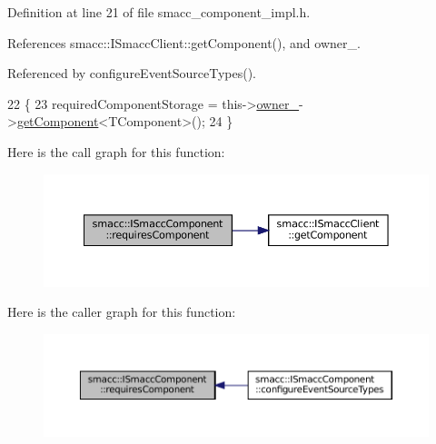 Definition at line 21 of file smacc\+\_\+component\+\_\+impl.\+h.



References smacc\+::\+I\+Smacc\+Client\+::get\+Component(), and owner\+\_\+.



Referenced by configure\+Event\+Source\+Types().


\begin{DoxyCode}
22     \{
23         requiredComponentStorage = this->\hyperlink{classsmacc_1_1ISmaccComponent_a909590e672450ce0eb0d8facb45c737a}{owner\_}->\hyperlink{classsmacc_1_1ISmaccClient_adef78db601749ca63c19e74a27cb88cc}{getComponent}<TComponent>();
24     \}
\end{DoxyCode}
Here is the call graph for this function\+:
\nopagebreak
\begin{figure}[H]
\begin{center}
\leavevmode
\includegraphics[width=350pt]{classsmacc_1_1ISmaccComponent_aa06d58b1dcec3c513ca2edddfd3847ec_cgraph}
\end{center}
\end{figure}
Here is the caller graph for this function\+:
\nopagebreak
\begin{figure}[H]
\begin{center}
\leavevmode
\includegraphics[width=350pt]{classsmacc_1_1ISmaccComponent_aa06d58b1dcec3c513ca2edddfd3847ec_icgraph}
\end{center}
\end{figure}
\mbox{\label{classsmacc_1_1ISmaccComponent_afe57665a6982475e8f9c2a5885e986e1}} 
